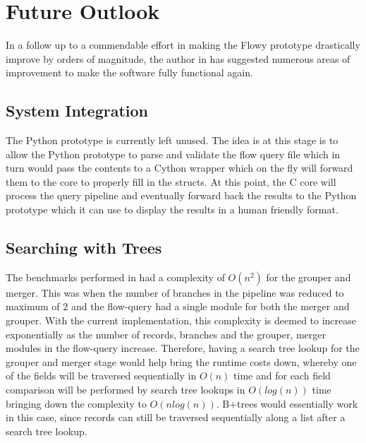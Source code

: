 \section{Future Outlook}\label{sec:flowy2-future}
In a follow up to a commendable effort in making the Flowy prototype drastically improve by orders of magnitude, the author in \cite{jschauer:thesis:2011} has suggested numerous areas of improvement to make the software fully functional again.

\subsection{System Integration}\label{subsec:system-integration}
The Python prototype is currently left unused. The idea is at this stage is to allow the Python prototype to parse and validate the flow query file which in turn would pass the contents to a Cython wrapper which on the fly will forward them to the core to properly fill in the structs. At this point, the C core will process the query pipeline and eventually forward back the results to the Python prototype which it can use to display the results in a human friendly format.

\subsection{Searching with Trees}\label{subsec:search-trees} 
The benchmarks performed in \cite{jschauer:thesis:2011} had a complexity of $O(n^2)$ for the grouper and merger. This was when the number of branches in the pipeline was reduced to maximum of $2$ and the flow-query had a single module for both the merger and grouper. With the current implementation, this complexity is deemed to increase exponentially as the number of records, branches and the grouper, merger modules in the flow-query increase. Therefore, having a search tree lookup for the grouper and merger stage would help bring the runtime costs down, whereby one of the fields will be traversed sequentially in $O(n)$ time and for each field comparison will be performed  by search tree lookups in $O(log(n))$ time bringing down the complexity to $O(nlog(n))$. B+trees would essentially work in this case, since records can still be traversed sequentially along a list after a search tree lookup. 

